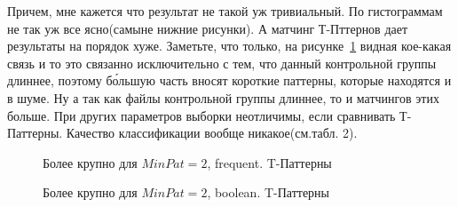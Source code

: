 \documentclass[12pt]{report}
\begin{document}
Причем, мне кажется что результат не такой уж тривиальный. По гистограммам не так уж все ясно(самыне нижние рисунки). А матчинг 
Т-Пттернов дает результаты на порядок хуже.
Заметьте, что только, на рисунке~\ref{fig:TP} видная кое-какая связь и то
это связанно исключительно с тем, что данный контрольной группы длиннее, поэтому б\'{о}льшую
часть вносят короткие паттерны, которые находятся и в шуме. Ну а так как файлы контрольной
группы длиннее, то и матчингов этих больше. При других параметров выборки неотличимы, если
сравнивать Т-Паттерны. Качество классификации вообще никакое(см.табл. 2).

\begin{figure}[h]
\noindent{}
\caption{ Более крупно для $MinPat=2$, frequent. T-Паттерны}
\label{fig:TP}
\end{figure}
\begin{figure}[h]
\noindent{}
\caption{ Более крупно для $MinPat=2$, boolean. T-Паттерны}

\end{figure}
\end{document}
